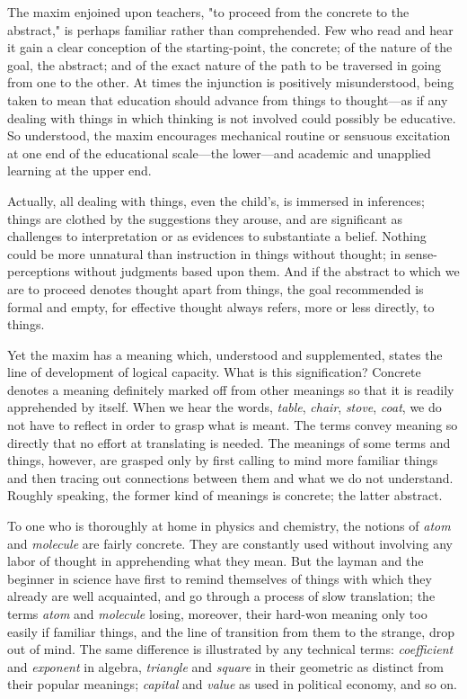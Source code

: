 \documentclass[showtrims,ustradepaper]{memoir}
\begin{document}

The maxim enjoined upon teachers, "to proceed from the concrete to the
abstract," is perhaps familiar rather than comprehended. Few who read
and hear it gain a clear conception of the starting-point, the concrete;
of the nature of the goal, the abstract; and of the exact nature of the
path to be traversed in going from one to the other. At times the
injunction is positively misunderstood, being taken to mean that
education should advance from things to thought---as if any dealing with
things in which thinking is not involved could possibly be educative. So
understood, the maxim encourages mechanical routine or sensuous
excitation at one end of the educational scale---the lower---and
academic and unapplied learning at the upper end.

Actually, all dealing with things, even the child's, is immersed in
inferences; things are clothed by the suggestions they arouse, and are
significant as challenges to interpretation or as evidences to
substantiate a belief. Nothing could be more unnatural than instruction
in things without thought; in sense-perceptions without judgments based
upon them. And if the abstract to which we are to proceed denotes
thought apart from things, the goal recommended is formal
and
empty, for effective thought always refers, more or less directly, to
things.


Yet the maxim has a meaning which, understood and supplemented, states
the line of development of logical capacity. What is this signification?
Concrete denotes a meaning definitely marked off from other meanings so
that it is readily apprehended by itself. When we hear the words,
\emph{table}, \emph{chair}, \emph{stove}, \emph{coat}, we do not have to
reflect in order to grasp what is meant. The terms convey meaning so
directly that no effort at translating is needed. The meanings of some
terms and things, however, are grasped only by first calling to mind
more familiar things and then tracing out connections between them and
what we do not understand. Roughly speaking, the former kind of meanings
is concrete; the latter abstract.


To one who is thoroughly at home in physics and chemistry, the notions
of \emph{atom} and \emph{molecule} are fairly concrete. They are
constantly used without involving any labor of thought in apprehending
what they mean. But the layman and the beginner in science have first to
remind themselves of things with which they already are well acquainted,
and go through a process of slow translation; the terms \emph{atom} and
\emph{molecule} losing, moreover, their hard-won meaning only too easily
if familiar things, and the line of transition from them to the strange,
drop out of mind. The same difference is illustrated by any technical
terms: \emph{coefficient} and \emph{exponent} in algebra,
\emph{triangle} and \emph{square} in their geometric as distinct from
their popular meanings; \emph{capital} and \emph{value} as used in
political economy, and so on.
\end{document}
